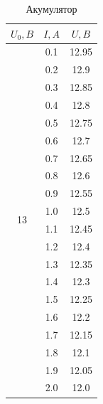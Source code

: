 \documentclass[a4paper,12pt]{article}
\begin{document}
	\begin{table}[h]
		\centering
		\caption{Акумулятор}
		\begin{tabular}{|c|c|c|}
			\hline
			\textbf{$U_0, B$}    & \textbf{$I, A$} & \textbf{$U, B$} \\ \hline
			\multirow{20}{*}{13} & 0.1             & 12.95           \\ \cline{2-3} 
			& 0.2             & 12.9            \\ \cline{2-3} 
			& 0.3             & 12.85           \\ \cline{2-3} 
			& 0.4             & 12.8            \\ \cline{2-3} 
			& 0.5             & 12.75           \\ \cline{2-3} 
			& 0.6             & 12.7            \\ \cline{2-3} 
			& 0.7             & 12.65           \\ \cline{2-3} 
			& 0.8             & 12.6            \\ \cline{2-3} 
			& 0.9             & 12.55           \\ \cline{2-3} 
			& 1.0             & 12.5            \\ \cline{2-3} 
			& 1.1             & 12.45           \\ \cline{2-3} 
			& 1.2             & 12.4            \\ \cline{2-3} 
			& 1.3             & 12.35           \\ \cline{2-3} 
			& 1.4             & 12.3            \\ \cline{2-3} 
			& 1.5             & 12.25           \\ \cline{2-3} 
			& 1.6             & 12.2            \\ \cline{2-3} 
			& 1.7             & 12.15           \\ \cline{2-3} 
			& 1.8             & 12.1            \\ \cline{2-3} 
			& 1.9             & 12.05           \\ \cline{2-3} 
			& 2.0             & 12.0            \\ \hline
		\end{tabular}
	\end{table}
\end{document}
